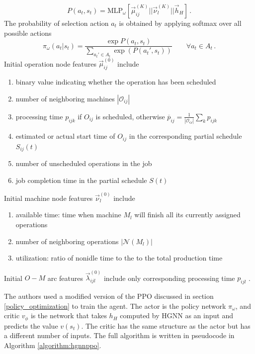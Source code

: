 \begin{equation}
    P(a_t, s_t) = \text{MLP}_{\omega} \left [ \vec{\mu}_{ij}^{(K)} || \vec{\nu}_l^{(K)} || \vec{h}_H \right ] \, .
\end{equation}
The probability of selection action $a_t$ is obtained by applying softmax over all possible actions
\begin{equation}
    \pi_\omega (a_t|s_t) = \frac{\exp{P(a_t,s_t)}}{\sum_{a_t'\in A_t}\exp(P(a_t',s_t))} \hspace{2em} \forall a_t \in A_t \, . 
\end{equation}
Initial operation node features $\vec{\mu}_{ij}^{(0)}$ include \cite{9826438}
\begin{enumerate}
    \item  binary value indicating whether the operation has been scheduled
    \item number of neighboring machines $|\mathcal{O}_{ij}|$
    \item processing time $p_{ijk}$ if $O_{ij}$ is scheduled, otherwise $\overline{p}_{ij} = \frac{1}{|\mathcal{O_{ij}}|}\sum_k p_{ijk}$
    \item estimated or actual start time of $O_{ij}$ in the corresponding partial schedule $S_{ij}(t)$
    \item number of unscheduled operations in the job
    \item job completion time in the partial schedule $S(t)$
\end{enumerate}
\clearpage
Initial machine node features $\vec{\nu}_{l}^{(0)}$ include \cite{9826438}
\begin{enumerate}
    \item available time: time when machine $M_l$ will finish all its currently assigned operations
    \item number of neighboring operations $|\mathcal{N}(M_l)|$
    \item utilization: ratio of nonidle time to the to the total production time
\end{enumerate}
Initial $O-M$ arc features $\vec{\lambda}_{ijl}^{(0)}$ include only corresponding processing time $p_{ijl}$ \cite{9826438}.
\par
The authors used a modified version of the PPO discussed in section \ref{policy_optimization} to train the agent. The actor is the policy network $\pi_\omega$, and critic $v_\phi$ is the network that takes $h_H$ computed by HGNN as an input and predicts the value $v(s_t)$. The critic has the same structure as the actor but has a different number of inputs. The full algorithm is written in pseudocode in Algorithm \ref{algorithm:hgnnppo}. 

